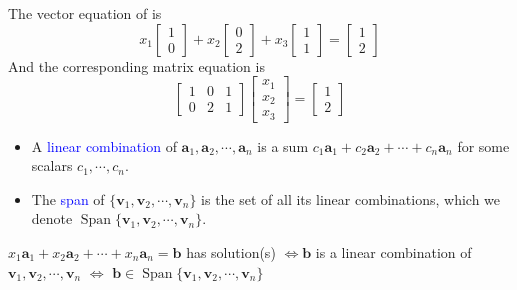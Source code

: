 \documentclass{beamer}
\theoremstyle{definition}
\theoremstyle{remark}
\DeclareMathOperator{\Span}{Span}
\begin{document}
\begin{frame}[t]
\begin{example}\label{16:17-06/03/2022}
The vector equation of  is\pause
\[
x_1\begin{bmatrix}
1\\0
\end{bmatrix}+x_2\begin{bmatrix}
0\\2
\end{bmatrix}+x_3\begin{bmatrix}
1\\1
\end{bmatrix}=\begin{bmatrix}
1\\2
\end{bmatrix}
\]\pause
And the corresponding matrix equation is\pause
\[
\begin{bmatrix}
1&0&1\\
0&2&1
\end{bmatrix}\begin{bmatrix}
x_1\\x_2\\x_3
\end{bmatrix}=\begin{bmatrix}
1\\2
\end{bmatrix}
\]
\end{example}
\end{frame}

\begin{frame}[t]
\begin{definition}\hfill
\begin{itemize}
\item A \textcolor{blue}{linear combination} of $\mathbf a_1,\mathbf a_2,\cdots,\mathbf a_n$ is a sum $c_1\mathbf a_1+c_2\mathbf a_2+\cdots+c_n\mathbf a_n$ for some scalars $c_1,\cdots,c_n$.\pause
\item The \textcolor{blue}{span} of $\{\mathbf v_1,\mathbf v_2,\cdots,\mathbf v_n\}$ is the set of all its linear combinations, which we denote $\Span\{\mathbf v_1, \mathbf v_2,\cdots,\mathbf v_n\}$.
\end{itemize}
\end{definition}
\pause
\begin{theorem}
$x_1\mathbf a_1+x_2\mathbf a_2+\cdots+x_n\mathbf a_n=\mathbf b$ has solution(s) $\iff\mathbf b$ is a linear combination of $\mathbf v_1, \mathbf v_2,\cdots,\mathbf v_n$ $\iff$ $\mathbf b\in\Span\{\mathbf v_1, \mathbf v_2,\cdots,\mathbf v_n\}$
\end{theorem}
\end{frame}
\end{document}
